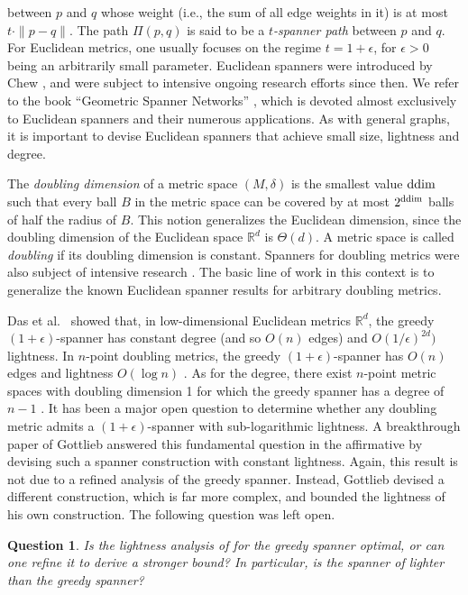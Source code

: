 \documentclass[11pt,letterpaper]{article}
\newtheorem{question}{Question}
\newcommand{\ddim}{{\rm ddim}}
\newcommand{\R}{\mathbb{R}}
\newcommand{\eps}{\epsilon}
\begin{document}
between $p$ and $q$ whose weight (i.e., the sum of all edge weights in it) is at most $t \cdot \|p-q\|$.
The path $\Pi(p,q)$ is said to be a \emph{$t$-spanner path} between $p$ and $q$.
For Euclidean metrics, one usually focuses on the regime $t = 1+\eps$, for $\eps > 0$ being an arbitrarily small parameter.
Euclidean spanners were introduced by Chew \cite{Chew86}, and were subject to intensive ongoing research efforts since then.
We refer to the book ``Geometric Spanner Networks'' \cite{NS07}, which is devoted almost exclusively to Euclidean spanners and their numerous applications.
As with general graphs, it is important to devise Euclidean spanners that achieve small size, lightness and degree.

The \emph{doubling dimension} of a metric space $(M,\delta)$ is the smallest value $\ddim$
such that every ball $B$ in the metric space can be covered by at most
$2^{\ddim}$ balls of half the radius of $B$.
This notion generalizes the Euclidean dimension, since the doubling dimension
of the Euclidean space $\mathbb R^d$ is $\Theta(d)$.
A metric space is called \emph{doubling} if its doubling dimension is constant.
Spanners for doubling metrics were also subject of intensive research  \cite{GGN04,CGMZ16,CG09,HM06,Roditty12,GR081,GR082,Smid09,ES15,Sol14}.
The basic line of work in this context is to generalize the known Euclidean spanner results for arbitrary doubling metrics.

Das et al.\ \cite{DHN93} showed that, in low-dimensional Euclidean metrics $\R^d$, the greedy $(1+\eps)$-spanner has constant degree (and so $O(n)$ edges)
and $O(1/\eps)^{2d})$ lightness.
In $n$-point doubling metrics, the greedy $(1+\eps)$-spanner has $O(n)$ edges and lightness $O(\log n)$ \cite{Smid09}.
As for the degree, there exist $n$-point metric spaces with doubling dimension 1 for which the greedy spanner has a degree of $n-1$ \cite{HM06,Smid09}.
It has been a major open question to determine whether any doubling metric admits
a $(1+\eps)$-spanner  with sub-logarithmic lightness.
A breakthrough paper of Gottlieb \cite{Got15} answered this fundamental question in the affirmative by devising such a spanner construction with constant lightness.
Again, this result is not due to a refined analysis of the greedy spanner. Instead, Gottlieb devised a different construction,
which is far more complex, and bounded the lightness of his own construction. The following question was left open.
\begin{question} \label{question2}
	Is the lightness analysis of \cite{Smid09} for the greedy spanner optimal, or can one refine it to derive a stronger bound?
	In particular, is the spanner of \cite{Got15} lighter than the greedy spanner?
\end{question}
\end{document}
